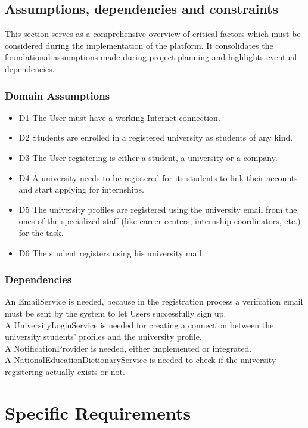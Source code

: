 \documentclass[a4paper,12pt]{article}
\begin{document}
\subsection{Assumptions, dependencies and constraints}
This section serves as a comprehensive overview of critical factors which must be considered during the implementation of the platform. It consolidates the foundational assumptions made during project planning and highlights eventual dependencies.
\subsubsection{Domain Assumptions}
    \begin{itemize}
        \item D1 The User must have a working Internet connection.
        \item D2 Students are enrolled in a registered university as students of any kind.
        \item D3 The User registering is either a student, a university or a company.
        \item D4 A university needs to be registered for its students to link their accounts and start applying for internships.
        \item D5 The university profiles are registered using the university email from the ones of the specialized staff (like career centers, internship coordinators, etc.) for the task.
        \item D6 The student registers using his university mail.

    \end{itemize}
\subsubsection{Dependencies}
An EmailService is needed, because in the registration process a verifcation email must be sent by the system to let Users successfully sign up.
\\A UniversityLoginService is needed for creating a connection between the university students' profiles and the university profile.
\\A NotificationProvider is needed, either implemented or integrated.
    \\A NationalEducationDictionaryService is needed to check if the university registering actually exists or not.

\section{Specific Requirements}
\end{document}
